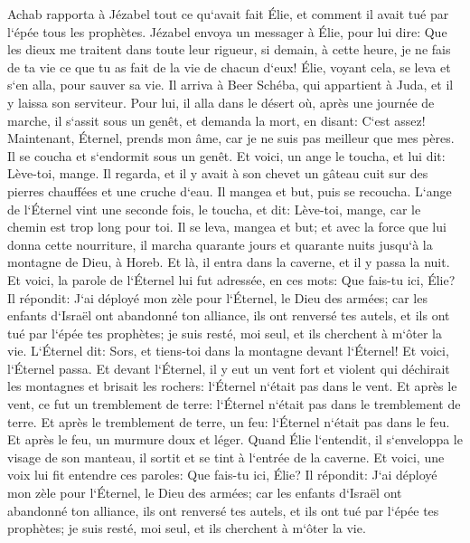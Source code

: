\verse Achab rapporta à Jézabel tout ce qu`avait fait Élie, et comment il avait tué par l`épée tous les prophètes. 
\verse Jézabel envoya un messager à Élie, pour lui dire: Que les dieux me traitent dans toute leur rigueur, si demain, à cette heure, je ne fais de ta vie ce que tu as fait de la vie de chacun d`eux! 
\verse Élie, voyant cela, se leva et s`en alla, pour sauver sa vie. Il arriva à Beer Schéba, qui appartient à Juda, et il y laissa son serviteur. 
\verse Pour lui, il alla dans le désert où, après une journée de marche, il s`assit sous un genêt, et demanda la mort, en disant: C`est assez! Maintenant, Éternel, prends mon âme, car je ne suis pas meilleur que mes pères. 
\verse Il se coucha et s`endormit sous un genêt. Et voici, un ange le toucha, et lui dit: Lève-toi, mange. 
\verse Il regarda, et il y avait à son chevet un gâteau cuit sur des pierres chauffées et une cruche d`eau. Il mangea et but, puis se recoucha. 
\verse L`ange de l`Éternel vint une seconde fois, le toucha, et dit: Lève-toi, mange, car le chemin est trop long pour toi. 
\verse Il se leva, mangea et but; et avec la force que lui donna cette nourriture, il marcha quarante jours et quarante nuits jusqu`à la montagne de Dieu, à Horeb. 
\verse Et là, il entra dans la caverne, et il y passa la nuit. Et voici, la parole de l`Éternel lui fut adressée, en ces mots: Que fais-tu ici, Élie? 
\verse Il répondit: J`ai déployé mon zèle pour l`Éternel, le Dieu des armées; car les enfants d`Israël ont abandonné ton alliance, ils ont renversé tes autels, et ils ont tué par l`épée tes prophètes; je suis resté, moi seul, et ils cherchent à m`ôter la vie. 
\verse L`Éternel dit: Sors, et tiens-toi dans la montagne devant l`Éternel! Et voici, l`Éternel passa. Et devant l`Éternel, il y eut un vent fort et violent qui déchirait les montagnes et brisait les rochers: l`Éternel n`était pas dans le vent. Et après le vent, ce fut un tremblement de terre: l`Éternel n`était pas dans le tremblement de terre. 
\verse Et après le tremblement de terre, un feu: l`Éternel n`était pas dans le feu. Et après le feu, un murmure doux et léger. 
\verse Quand Élie l`entendit, il s`enveloppa le visage de son manteau, il sortit et se tint à l`entrée de la caverne. Et voici, une voix lui fit entendre ces paroles: Que fais-tu ici, Élie? 
\verse Il répondit: J`ai déployé mon zèle pour l`Éternel, le Dieu des armées; car les enfants d`Israël ont abandonné ton alliance, ils ont renversé tes autels, et ils ont tué par l`épée tes prophètes; je suis resté, moi seul, et ils cherchent à m`ôter la vie. 
